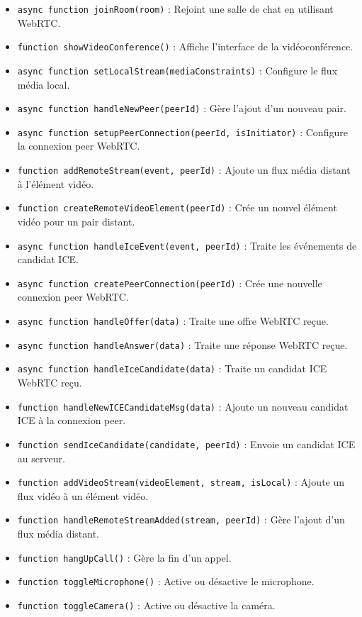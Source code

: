 \documentclass[12pt, a4paper, oneside]{Thesis}
\begin{document}
\begin{itemize}
  \item \verb|async function joinRoom(room)| : Rejoint une salle de chat en utilisant WebRTC.
  \item \verb|function showVideoConference()| : Affiche l'interface de la vidéoconférence.
  \item \verb|async function setLocalStream(mediaConstraints)| : Configure le flux média local.
  \item \verb|async function handleNewPeer(peerId)| : Gère l'ajout d'un nouveau pair.
  \item \verb|async function setupPeerConnection(peerId, isInitiator)| : Configure la connexion peer WebRTC.
  \item \verb|function addRemoteStream(event, peerId)| : Ajoute un flux média distant à l'élément vidéo.
  \item \verb|function createRemoteVideoElement(peerId)| : Crée un nouvel élément vidéo pour un pair distant.
  \item \verb|async function handleIceEvent(event, peerId)| : Traite les événements de candidat ICE.
  \item \verb|async function createPeerConnection(peerId)| : Crée une nouvelle connexion peer WebRTC.
  \item \verb|async function handleOffer(data)| : Traite une offre WebRTC reçue.
  \item \verb|async function handleAnswer(data)| : Traite une réponse WebRTC reçue.
  \item \verb|async function handleIceCandidate(data)| : Traite un candidat ICE WebRTC reçu.
  \item \verb|function handleNewICECandidateMsg(data)| : Ajoute un nouveau candidat ICE à la connexion peer.
  \item \verb|function sendIceCandidate(candidate, peerId)| : Envoie un candidat ICE au serveur.
  \item \verb|function addVideoStream(videoElement, stream, isLocal)| : Ajoute un flux vidéo à un élément vidéo.
  \item \verb|function handleRemoteStreamAdded(stream, peerId)| : Gère l'ajout d'un flux média distant.
  \item \verb|function hangUpCall()| : Gère la fin d'un appel.
  \item \verb|function toggleMicrophone()| : Active ou désactive le microphone.
  \item \verb|function toggleCamera()| : Active ou désactive la caméra.
\end{itemize}
\end{document}
